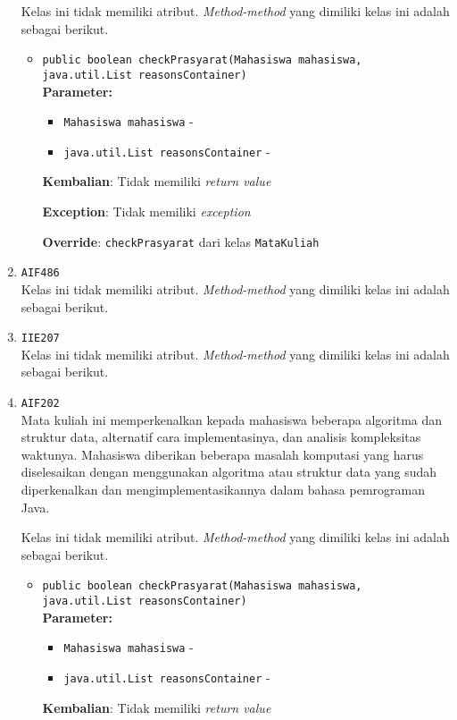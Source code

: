 \documentclass{article}
\begin{document}
\begin{enumerate}
Kelas ini tidak memiliki atribut. \textit{Method-method} yang dimiliki kelas ini adalah sebagai berikut.
\begin{itemize}
\item \texttt{public boolean checkPrasyarat(Mahasiswa mahasiswa, java.util.List reasonsContainer)}\\ 


\textbf{Parameter:}\begin{itemize}
\item \texttt{Mahasiswa mahasiswa} - 
\item \texttt{java.util.List reasonsContainer} - 
\end{itemize}
\textbf{Kembalian}: Tidak memiliki \textit{return value}

\textbf{Exception}: Tidak memiliki \textit{exception}

\textbf{Override}: \texttt{checkPrasyarat} dari kelas \texttt{MataKuliah}

\end{itemize}
\item \texttt{AIF486}\\ 
Kelas ini tidak memiliki atribut. \textit{Method-method} yang dimiliki kelas ini adalah sebagai berikut.
\begin{itemize}
\end{itemize}
\item \texttt{IIE207}\\ 
Kelas ini tidak memiliki atribut. \textit{Method-method} yang dimiliki kelas ini adalah sebagai berikut.
\begin{itemize}
\end{itemize}
\item \texttt{AIF202}\\ 
Mata kuliah ini memperkenalkan kepada mahasiswa beberapa algoritma dan 
 struktur data, alternatif cara implementasinya, dan analisis kompleksitas 
 waktunya. Mahasiswa diberikan beberapa masalah komputasi yang harus 
 diselesaikan dengan menggunakan algoritma atau struktur data yang sudah 
 diperkenalkan dan mengimplementasikannya dalam bahasa pemrograman Java.

Kelas ini tidak memiliki atribut. \textit{Method-method} yang dimiliki kelas ini adalah sebagai berikut.
\begin{itemize}
\item \texttt{public boolean checkPrasyarat(Mahasiswa mahasiswa, java.util.List reasonsContainer)}\\ 


\textbf{Parameter:}\begin{itemize}
\item \texttt{Mahasiswa mahasiswa} - 
\item \texttt{java.util.List reasonsContainer} - 
\end{itemize}
\textbf{Kembalian}: Tidak memiliki \textit{return value}


\end{itemize}
\end{enumerate}
\end{document}
